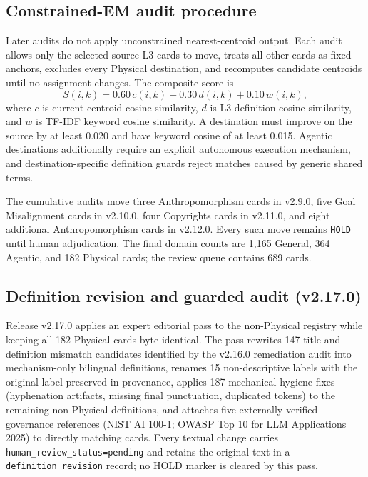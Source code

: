 \documentclass[11pt,a4paper]{article}
\newcommand{\code}[1]{\texttt{#1}}
\begin{document}
\subsection{Constrained-EM audit procedure}
\label{sec:cem}

Later audits do not apply unconstrained nearest-centroid output. Each audit
allows only the selected source L3 cards to move, treats all other cards as
fixed anchors, excludes every Physical destination, and recomputes candidate
centroids until no assignment changes. The composite score is
\begin{equation}
S(i,k)=0.60\,c(i,k)+0.30\,d(i,k)+0.10\,w(i,k),
\end{equation}
where $c$ is current-centroid cosine similarity, $d$ is L3-definition cosine
similarity, and $w$ is TF-IDF keyword cosine similarity. A destination must
improve on the source by at least 0.020 and have keyword cosine of at least
0.015. Agentic destinations additionally require an explicit autonomous
execution mechanism, and destination-specific definition guards reject
matches caused by generic shared terms.

The cumulative audits move three Anthropomorphism cards in v2.9.0, five Goal
Misalignment cards in v2.10.0, four Copyrights cards in v2.11.0, and eight
additional Anthropomorphism cards in v2.12.0. Every such move remains
\code{HOLD} until human adjudication. The final domain counts are 1,165 General,
364 Agentic, and 182 Physical cards; the review queue contains 689 cards.

\subsection{Definition revision and guarded audit (v2.17.0)}

Release v2.17.0 applies an expert editorial pass to the non-Physical registry
while keeping all 182 Physical cards byte-identical. The pass rewrites 147
title and definition mismatch candidates identified by the v2.16.0 remediation
audit into mechanism-only bilingual definitions, renames 15 non-descriptive
labels with the original label preserved in provenance, applies 187 mechanical
hygiene fixes (hyphenation artifacts, missing final punctuation, duplicated
tokens) to the remaining non-Physical definitions, and attaches five
externally verified governance references (NIST AI 100-1; OWASP Top 10 for LLM
Applications 2025) to directly matching cards. Every textual change carries
\code{human\_review\_status=pending} and retains the original text in a
\code{definition\_revision} record; no HOLD marker is cleared by this pass.
\end{document}
